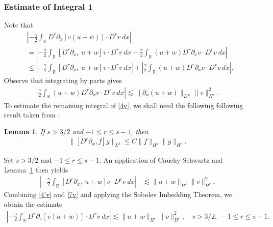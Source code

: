 \documentclass[12pt,reqno]{amsart}
\numberwithin{equation}{section}  %
\numberwithin{figure}{section}
\newcommand{\rr}{\mathbb{R}}
\newcommand{\p}{\partial}
\newtheorem{lemma}[theorem]{Lemma}
\begin{document}
\subsubsection{Estimate of Integral 1} Note that
%
%
\begin{equation}
\begin{split}
& \left |  -\frac{\gamma}{2} \int_{\rr} D^r \p_x [v(u+w)] \cdot
D^r v \ dx \right |
\\
& =
\left |
-\frac{\gamma}{2} \int_{\rr} \left[ D^r \p_x, \ u+w \right]v \cdot
D^r v \ dx - \frac{\gamma}{2} \int_{\rr} (u+w) D^r
\p_x v \cdot D^r v\ dx
\right | \\
& \le \left |
-\frac{\gamma}{2} \int_{\rr} \left[ D^r \p_x, \ u+w \right]v \cdot
D^r v \ dx \right |
+ \left | \frac{\gamma}{2} \int_{\rr} (u+w) D^r \p_x v
\cdot D^r v\
dx \right |.
\label{4v}
\end{split}
\end{equation}
%
%
Observe that integrating by parts gives
%
%
\begin{equation}
\begin{split}
\left | \frac{\gamma}{2}\int_{\rr} (u+w) D^r \p_x v \cdot
D^r v \ dx \right |
\lesssim \|\p_x (u+w)\|_{L^\infty}
\|v\|_{H^r}^2.
\label{4'v}
\end{split}
\end{equation}
%
%
%
%
To estimate the remaining integral of \eqref{4v}, we shall need the following
following result taken from \cite{Himonas_2009_Non-uniform-dep-per}:
%
\begin{lemma}
\label{cor1}
If $s > 3/2$ and $-1 \le r  \le s -1$, then
%
%
\begin{equation}
\begin{split}
\|[D^r \p_x ,f]g\|_{L^2} \le C \|f\|_{H^s} \|g\|_{H^r}.
\label{15}
\end{split}
\end{equation}
%
%
\end{lemma}
%
%
Set $s > 3/2$ and $-1 \le r \le s -1$. An application of 
Cauchy-Schwartz and Lemma~\ref{cor1} then yields 
%
%
\begin{equation}
\begin{split}
 \left | -\frac{\gamma}{2} \int_{\rr} [D^r \p_x, \ u+w] v
\cdot D^r v \ dx \right |
& \lesssim \|u+w\|_{H^s} 
\|v\|_{H^r}^2.
\label{7v}
\end{split}
\end{equation}
%
%
Combining \eqref{4'v} and \eqref{7v} and applying the Sobolev Imbedding 
Theorem, we obtain the estimate
%
%
\begin{equation}
\begin{split}
\left |  -\frac{\gamma}{2} \int_{\rr} D^r \p_x [v(u+w)] \cdot
D^r v \ dx \right |
 \lesssim \|u+w\|_{H^s} \|v\|_{H^r}^2, \quad s > 3/2, \ -1 \le r \le s-1.
\label{8v}
\end{split}
\end{equation}
%
%
\end{document}
